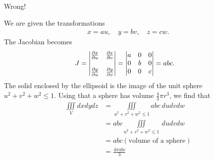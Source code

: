\documentclass{article}
\begin{document}
Wrong!
\item %
We are given the transformations
\begin{align*}
  x=au, \quad y=bv, \quad z=cw.
\end{align*}
The Jacobian becomes
\begin{align*}   J &=  
  \begin{vmatrix}
   \frac{\partial x}{\partial u} &  \frac{\partial x}{\partial v} \\ \\
   \frac{\partial y}{\partial u} & \frac{\partial y}{\partial v} \\
  \end{vmatrix}
  =     \begin{vmatrix}
 a&0&0\\
 0&b&0\\
 0&0&c\\
  \end{vmatrix}
  = abc.
 \end{align*}
 The solid enclosed by the ellipsoid is the image of the unit sphere $u^2 + v^2 + w^2 \le 1$. Using that a sphere has volume $\frac{4}{3} \pi r^3$, we find that 
\begin{align*}
  \iiint\limits_{V} dxdydz
  &=  \iiint\limits_{u^2+v^2+w^2 \le 1} abc \ dudvdw \\
  &=  abc \iiint\limits_{u^2+v^2+w^2 \le 1} \ dudvdw \\
  &=  abc (\text{volume of a sphere}) \\
  &=   \frac{4\pi abc}{3} 
\end{align*}
\EEN %
\end{document}
